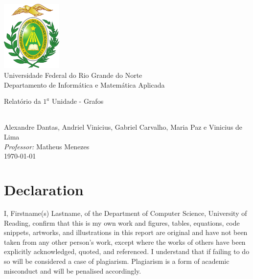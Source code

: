 \documentclass[a4paper,11pt,oneside]{book}
\begin{document}

\frontmatter

\begin{titlepage}
  \begin{center}
    \includegraphics[width=3cm]{figures/ufrnlogo.png}\\[0.5cm]
    {\LARGE Universidade Federal do Rio Grande do Norte\\[0.5cm]
    Departamento de Informática e Matemática Aplicada}\\[2cm]

    \linespread{1.2}\huge {
      Relatório da $1^a$ Unidade - Grafos

    }
    \linespread{1}~\\[2cm]
    {\Large
      Alexandre Dantas, Andriel Vinicius, Gabriel Carvalho, Maria Paz
      e Vinicius de Lima
    }\\[1cm]

    {\large \emph{Professor:} Matheus Menezes}\\[1cm]

    {\Large \today}
  \end{center}
\end{titlepage}

\newpage
\thispagestyle{empty}
\chapter*{\Large Declaration}
I,
Firstname(s) Lastname, %
of the Department of Computer Science, University of Reading, confirm
that this is my own work and figures, tables, equations, code
snippets, artworks, and illustrations in this report are original and
have not been taken from any other person's work, except where the
works of others have been explicitly acknowledged, quoted, and
referenced. I understand that if failing to do so will be considered
a case of plagiarism. Plagiarism is a form of academic misconduct and
will be penalised accordingly. \\
\end{document}
